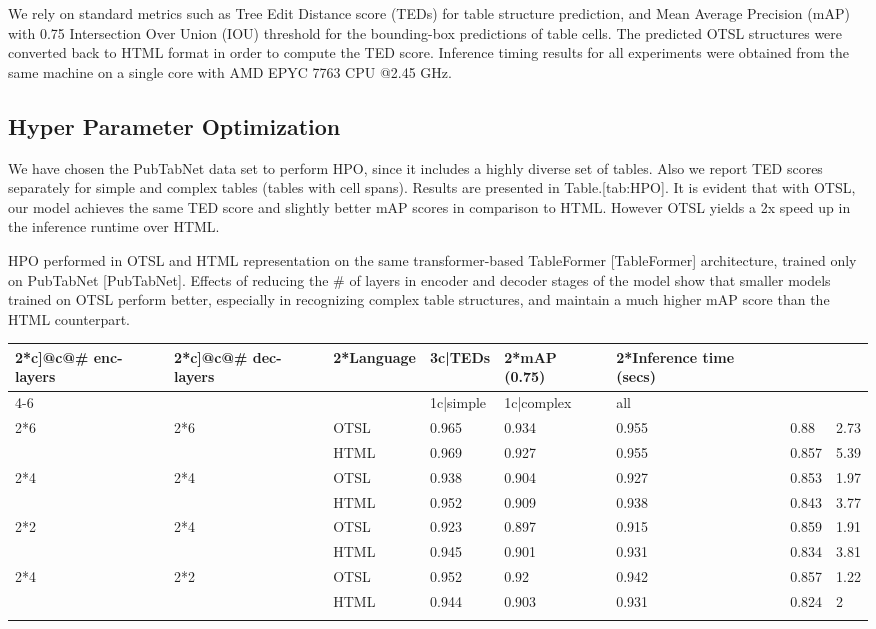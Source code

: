 \documentclass[11pt,a4paper]{article}
\begin{document}
We rely on standard metrics such as Tree Edit Distance score (TEDs) for table structure prediction, and Mean Average Precision (mAP) with 0.75 Intersection Over Union (IOU) threshold for the bounding-box predictions of table cells.
The predicted OTSL structures were converted back to HTML format in order to compute the TED score. Inference timing results for all experiments were obtained from the same machine on a single core with AMD EPYC 7763 CPU @2.45 GHz.

\subsection{Hyper Parameter Optimization}

We have chosen the PubTabNet data set to perform HPO, since it includes a highly diverse set of tables. Also we report TED scores separately for simple and complex tables (tables with cell spans). Results are presented in Table.[tab:HPO]. It is evident that with OTSL, our model achieves the same TED score and slightly better mAP scores in comparison to HTML. However OTSL yields a 2x speed up in the inference runtime over HTML.

HPO performed in OTSL and HTML representation on the same transformer-based TableFormer [TableFormer] architecture, trained only on PubTabNet [PubTabNet]. Effects of reducing the \# of layers in encoder and decoder stages of the model show that smaller models trained on OTSL perform better, especially in recognizing complex table structures, and maintain a much higher mAP score than the HTML counterpart.

\begin{table}[h]
\begin{tabular}{|l|l|l|l|l|l|l|l|}
\hline
2*c]@c@\#  enc-layers & 2*c]@c@\#  dec-layers & 2*Language & 3c|TEDs & 2*mAP   (0.75) & 2*Inference   time (secs) &  &  \\ \hline
4-6 &  &  & 1c|simple & 1c|complex & all &  &  \\ \hline
2*6 & 2*6 & OTSL & 0.965 & 0.934 & 0.955 & 0.88 & 2.73 \\ \hline
 &  & HTML & 0.969 & 0.927 & 0.955 & 0.857 & 5.39 \\ \hline
2*4 & 2*4 & OTSL & 0.938 & 0.904 & 0.927 & 0.853 & 1.97 \\ \hline
 &  & HTML & 0.952 & 0.909 & 0.938 & 0.843 & 3.77 \\ \hline
2*2 & 2*4 & OTSL & 0.923 & 0.897 & 0.915 & 0.859 & 1.91 \\ \hline
 &  & HTML & 0.945 & 0.901 & 0.931 & 0.834 & 3.81 \\ \hline
2*4 & 2*2 & OTSL & 0.952 & 0.92 & 0.942 & 0.857 & 1.22 \\ \hline
 &  & HTML & 0.944 & 0.903 & 0.931 & 0.824 & 2 \\ \hline
 &  &  &  &  &  &  &  \\ \hline
\end{tabular}
\end{table}
\end{document}

